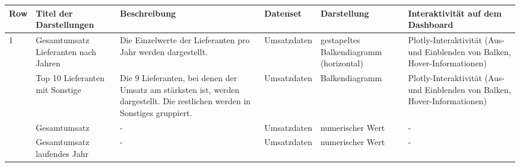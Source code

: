     \clearpage
    \recalctypearea  
    \begingroup
    \setlength{\tabcolsep}{12pt} %
    \renewcommand{\arraystretch}{1.5}
    \begin{table}[h]
        \LARGE
        \centering
        \begin{adjustbox}{max width=\textwidth}
        \begin{tabular}{p{}p{}p{}p{}p{}p{}}
           \toprule
           Row        &Titel der Darstellungen&Beschreibung &Datenset &Darstellung &Interaktivität auf dem Dashboard\\
           \midrule
            1           &Gesamtumsatz Lieferanten nach Jahren &Die Einzelwerte der Lieferanten pro Jahr werden dargestellt.   &Umsatzdaten    &gestapeltes Balkendiagramm (horizontal)    &Plotly-Interaktivität (Aus- und Einblenden von Balken, Hover-Informationen)\\
                        &Top 10 Lieferanten mit Sonstige &Die 9 Lieferanten, bei denen der Umsatz am stärksten ist, werden dargestellt. Die restlichen werden in Sonstiges gruppiert.   &Umsatzdaten    &Balkendiagramm    &Plotly-Interaktivität (Aus- und Einblenden von Balken, Hover-Informationen)\\
                        &Gesamtumsatz&-&Umsatzdaten    &numerischer Wert   &-\\
                        &Gesamtumsatz laufendes Jahr&-&Umsatzdaten    &numerischer Wert   &-\\
            

\end{tabular}
\end{adjustbox}
\end{table}
